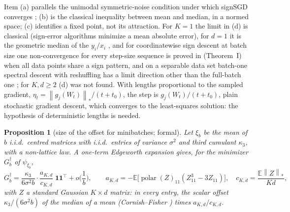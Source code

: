 \documentclass[10pt]{article}
\newtheorem{proposition}[theorem]{Proposition}
\theoremstyle{remark}
\newcommand{\E}{\mathbb{E}}
\newcommand{\nnuc}[1]{\left\|#1\right\|_{*}}
\newcommand{\polar}{\operatorname{polar}}
\newcommand{\ones}{\mathbf{1}}
\begin{document}
Item (a) parallels the unimodal symmetric-noise condition under which signSGD converges \cite{bernstein2019majority};
(b) is the classical inequality between mean and median, in a normed space; (c) identifies a fixed point, not its
attraction. For $K=1$ the limit in (d) is classical (sign-error algorithms minimize a mean absolute error), for $d=1$ it
is the geometric median of the $y_i/x_i$ \cite{cardot2013efficient}, and for coordinatewise sign descent at batch size
one non-convergence for every step-size sequence is proved in \cite{karimireddy2019error} (Theorem~I) when all data
points share a sign pattern, and on a separable data set batch-one spectral descent with reshuffling has a limit
direction other than the full-batch one \cite[Theorem~4.10]{li2026implicit}; for $K,d\ge2$ (d) was not found. With lengths proportional to the sampled gradient,
$\eta_t=\nnuc{g_j(W_t)}/(t+t_0)$, the step is $g_j(W_t)/(t+t_0)$, plain stochastic gradient descent, which converges
to the least-squares solution: the hypothesis of deterministic lengths is needed.

\begin{proposition}[size of the offset for minibatches; formal]\label{prop:offset}
Let $\xi_b$ be the mean of $b$ i.i.d.\ centred matrices with i.i.d.\ entries of variance $\sigma^2$ and third
cumulant $\kappa_3$, with a non-lattice law. A one-term Edgeworth expansion gives, for the minimizer $G_b^\dagger$ of
$\psi_{\xi_b}$,
\begin{equation}\label{eq:offset}
G_b^\dagger=\frac{\kappa_3}{6\sigma^2b}\cdot\frac{a_{K,d}}{c_{K,d}}\;\ones\ones^\top+o\Big(\frac1b\Big),\qquad
a_{K,d}=-\E\big[\polar(Z)_{11}(Z_{11}^3-3Z_{11})\big],\quad c_{K,d}=\frac{\E\nnuc Z}{Kd},
\end{equation}
with $Z$ a standard Gaussian $K\times d$ matrix: in every entry, the scalar offset $\kappa_3/(6\sigma^2b)$ of the
median of a mean (Cornish--Fisher \cite{cornish1938moments}) times $a_{K,d}/c_{K,d}$.
\end{proposition}
\end{document}
